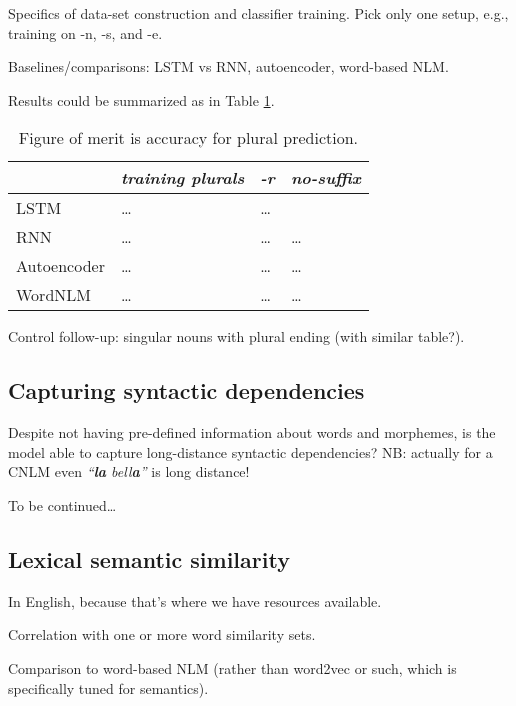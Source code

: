 Specifics of data-set construction and classifier training. Pick only one setup, e.g., training on -n, -s, and -e.

Baselines/comparisons: LSTM vs RNN, autoencoder, word-based NLM.

Results could be summarized as in Table \ref{tab:number-results}.


\begin{table}[t]
  \begin{center}
    \begin{tabular}{l|l|l|l}
      \multicolumn{1}{c}{}&\emph{training plurals}&\emph{-r}&\emph{no-suffix}\\
      \hline
      LSTM&\ldots&\ldots\\
      RNN&\ldots&\ldots&\ldots\\
      Autoencoder&\ldots&\ldots&\ldots\\
      WordNLM&\ldots&\ldots&\ldots\\
    \end{tabular}
  \end{center}
  \caption{\label{tab:number-results} Figure of merit is accuracy for plural prediction.}
\end{table}


Control follow-up: singular nouns with plural ending (with similar table?).

\subsection{Capturing syntactic dependencies}
\label{sec:dependencies}

Despite not having pre-defined information about words and morphemes,
is the model able to capture long-distance syntactic dependencies? NB:
actually for a CNLM even \emph{``\textbf{la} bell\textbf{a}''} is long
distance!

To be continued\ldots

\subsection{Lexical semantic similarity}
\label{sec:similarity}

In English, because that's where we have resources available.

Correlation with one or more word similarity sets.

Comparison to word-based NLM (rather than word2vec or such, which is
specifically tuned for semantics).

